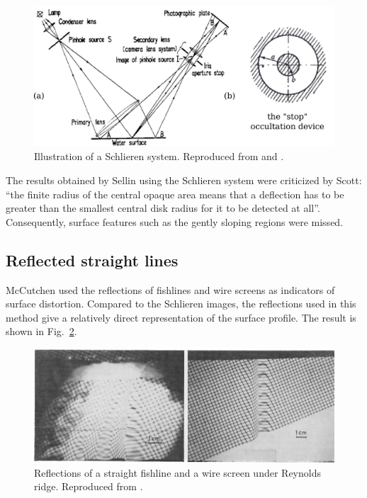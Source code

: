 \documentclass[12pt]{article}
\begin{document}
\begin{figure}
    \centering
    \includegraphics[width=\textwidth]{Figures/schlieren-system.pdf}
    \caption{Illustration of a Schlieren system. Reproduced from \cite{Sellin1963} and \cite{Sellin1968}.}
    \label{fig:schlieren-system}
\end{figure}

The results obtained by Sellin using the Schlieren system were criticized by Scott: ``the finite radius of the central opaque area means that a deflection has to be greater than the smallest central disk radius for it to be detected at all''. Consequently, surface features such as the gently sloping regions were missed. 

\subsection{Reflected straight lines}

McCutchen used the reflections of fishlines and wire screens as indicators of surface distortion. Compared to the Schlieren images, the reflections used in this method give a relatively direct representation of the surface profile. The result is shown in Fig.~\ref{fig:reflected-straight-lines}. 

\begin{figure}
    \centering
    \includegraphics[width=\textwidth]{Figures/reflection-straightline.png}
    \caption{Reflections of a straight fishline and a wire screen under Reynolds ridge. Reproduced from \cite{McCutchen1970}.}
    \label{fig:reflected-straight-lines}
\end{figure}
\end{document}
